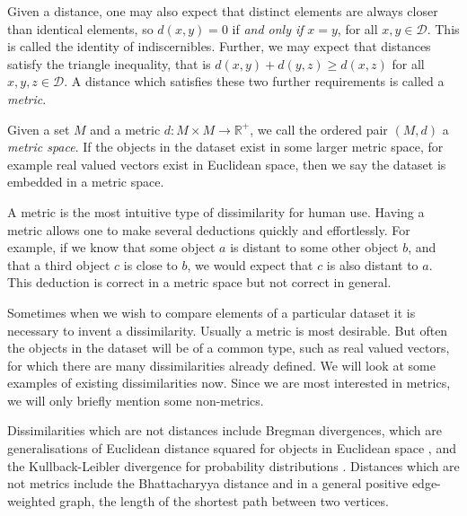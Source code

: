 \documentclass[a4paper]{report}
\newcommand{\dset}{\mathcal{D}}
\begin{document}
Given a distance, one may also expect that distinct elements are always closer
than identical elements, so $d(x,y)=0$ if \textit{and only if} $x=y$, for all
$x,y \in \dset$.  This is called the identity of indiscernibles.  Further, we
may expect that distances satisfy the triangle inequality, that is
$d(x,y)+d(y,z) \geq d(x,z)$ for all $x,y,z \in \dset$.  A distance which
satisfies these two further requirements is called a \textit{metric}.

Given a set $M$ and a metric $d \colon M \times M \to \mathbb{R}^+$, we call
the ordered pair $(M,d)$ a \textit{metric space}.  If the objects in the
dataset exist in some larger metric space, for example real valued vectors
exist in Euclidean space, then we say the dataset is embedded in a metric
space.

A metric is the most intuitive type of dissimilarity for human use.  Having a
metric allows one to make several deductions quickly and effortlessly.  For
example, if we know that some object $a$ is distant to some other object $b$,
and that a third object $c$ is close to $b$, we would expect that $c$ is also
distant to $a$.  This deduction is correct in a metric space but not correct
in general.

Sometimes when we wish to compare elements of a particular dataset it is
necessary to invent a dissimilarity.  Usually a metric is most desirable.  But
often the objects in the dataset will be of a common type, such as real valued
vectors, for which there are many dissimilarities already defined.  We will
look at some examples of existing dissimilarities now.  Since we are most
interested in metrics, we will only briefly mention some non-metrics.

Dissimilarities which are not distances include Bregman divergences, which are
generalisations of Euclidean distance squared for objects in Euclidean space
\citep{banerjee2005clustering}, and the Kullback-Leibler divergence for
probability distributions \citep{kullback68information}.  Distances which are
not metrics include the Bhattacharyya distance \citep{bhattacharyya43distance}
and in a general positive edge-weighted graph, the length of the shortest path
between two vertices.
\end{document}

